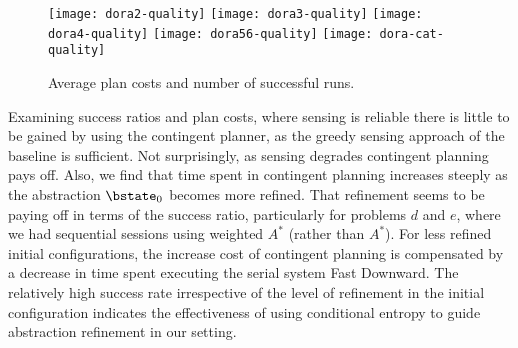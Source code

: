 \begin{figure}[h!]
  \texttt{[image: dora2-quality]}\hfill
  \texttt{[image: dora3-quality]}\hfill
  \texttt{[image: dora4-quality]}\hfill
  \vspace{2mm}
  \texttt{[image: dora56-quality]}\hfill
  \vspace{2mm}
  \texttt{[image: dora-cat-quality]}\hfill
  \caption{Average plan costs and number of successful runs.}
  \label{fig:results-quality}
\end{figure}



Examining success ratios and plan costs, where sensing is reliable
there is little to be gained by using the contingent planner, as the
greedy sensing approach of the baseline is sufficient. Not
surprisingly, as sensing degrades contingent planning pays off.  Also,
we find that time spent in contingent planning increases steeply as
the abstraction $\bstate_0$ becomes more refined.  That refinement
seems to be paying off in terms of the success ratio, particularly for
problems $d$ and $e$, where we had sequential sessions using weighted
$A^*$ (rather than $A^*$). For less refined initial configurations, the
increase cost of contingent planning is compensated by a decrease in
time spent executing the serial system Fast Downward. The relatively
high success rate irrespective of the level of refinement in the
initial configuration indicates the effectiveness of using conditional
entropy to guide abstraction refinement in our setting.









